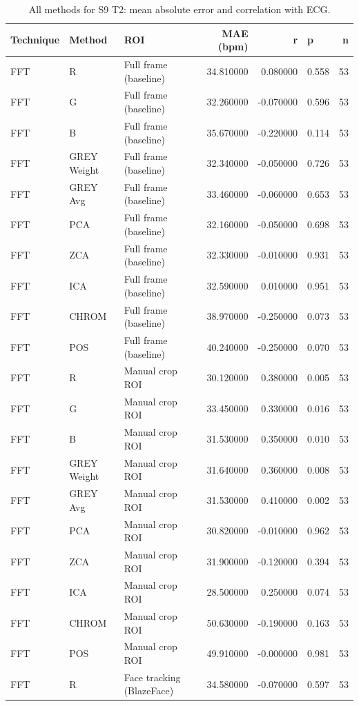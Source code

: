 \begin{table}[htbp]
\centering
\caption{All methods for S9 T2: mean absolute error and correlation with ECG.}
\label{tab:spread_s9_t2}
\begin{tabular}{l l l r r l r}
\toprule
Technique & Method & ROI & MAE (bpm) & r & p & n \\
\midrule
FFT & R & Full frame (baseline) & 34.810000 & 0.080000 & 0.558 & 53 \\
FFT & G & Full frame (baseline) & 32.260000 & -0.070000 & 0.596 & 53 \\
FFT & B & Full frame (baseline) & 35.670000 & -0.220000 & 0.114 & 53 \\
FFT & GREY Weight & Full frame (baseline) & 32.340000 & -0.050000 & 0.726 & 53 \\
FFT & GREY Avg & Full frame (baseline) & 33.460000 & -0.060000 & 0.653 & 53 \\
FFT & PCA & Full frame (baseline) & 32.160000 & -0.050000 & 0.698 & 53 \\
FFT & ZCA & Full frame (baseline) & 32.330000 & -0.010000 & 0.931 & 53 \\
FFT & ICA & Full frame (baseline) & 32.590000 & 0.010000 & 0.951 & 53 \\
FFT & CHROM & Full frame (baseline) & 38.970000 & -0.250000 & 0.073 & 53 \\
FFT & POS & Full frame (baseline) & 40.240000 & -0.250000 & 0.070 & 53 \\
FFT & R & Manual crop ROI & 30.120000 & 0.380000 & 0.005 & 53 \\
FFT & G & Manual crop ROI & 33.450000 & 0.330000 & 0.016 & 53 \\
FFT & B & Manual crop ROI & 31.530000 & 0.350000 & 0.010 & 53 \\
FFT & GREY Weight & Manual crop ROI & 31.640000 & 0.360000 & 0.008 & 53 \\
FFT & GREY Avg & Manual crop ROI & 31.530000 & 0.410000 & 0.002 & 53 \\
FFT & PCA & Manual crop ROI & 30.820000 & -0.010000 & 0.962 & 53 \\
FFT & ZCA & Manual crop ROI & 31.900000 & -0.120000 & 0.394 & 53 \\
FFT & ICA & Manual crop ROI & 28.500000 & 0.250000 & 0.074 & 53 \\
FFT & CHROM & Manual crop ROI & 50.630000 & -0.190000 & 0.163 & 53 \\
FFT & POS & Manual crop ROI & 49.910000 & -0.000000 & 0.981 & 53 \\
FFT & R & Face tracking (BlazeFace) & 34.580000 & -0.070000 & 0.597 & 53 \\

\end{tabular}
\end{table}
